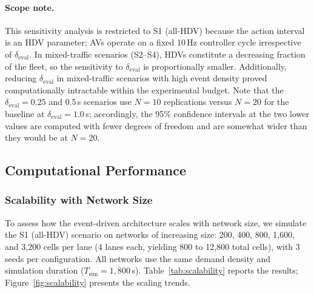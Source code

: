 \documentclass[review,authoryear]{elsarticle}
\begin{document}
\paragraph{Scope note.} This sensitivity analysis is restricted to S1 (all-HDV) because the action interval is an HDV parameter; AVs operate on a fixed 10\,Hz controller cycle irrespective of $\delta_{\text{eval}}$. In mixed-traffic scenarios (S2--S4), HDVs constitute a decreasing fraction of the fleet, so the sensitivity to $\delta_{\text{eval}}$ is proportionally smaller. Additionally, reducing $\delta_{\text{eval}}$ in mixed-traffic scenarios with high event density proved computationally intractable within the experimental budget. Note that the $\delta_{\text{eval}} = 0.25$ and $0.5$\,s scenarios use $N = 10$ replications versus $N = 20$ for the baseline at $\delta_{\text{eval}} = 1.0$\,s; accordingly, the 95\% confidence intervals at the two lower values are computed with fewer degrees of freedom and are somewhat wider than they would be at $N = 20$.


\subsection{Computational Performance}
\label{sec:exp_performance_new}

\subsubsection{Scalability with Network Size}
\label{sec:exp_scalability}

To assess how the event-driven architecture scales with network size, we simulate the S1 (all-HDV) scenario on networks of increasing size: 200, 400, 800, 1{,}600, and 3{,}200 cells per lane (4 lanes each, yielding 800 to 12{,}800 total cells), with 3 seeds per configuration. All networks use the same demand density and simulation duration ($T_{\text{sim}} = 1{,}800$\,s). Table~\ref{tab:scalability} reports the results; Figure~\ref{fig:scalability} presents the scaling trends.
\end{document}
